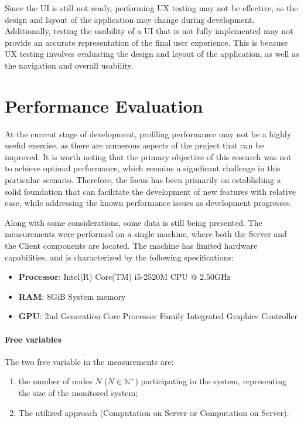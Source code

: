 Since the UI is still not ready, performing UX testing may not be effective, as the design and layout of the application may change during development. Additionally, testing the usability of a UI that is not fully implemented may not provide an accurate representation of the final user experience. This is because UX testing involves evaluating the design and layout of the application, as well as the navigation and overall usability.

\section{Performance Evaluation}
\label{sec:performance-evaluation}
At the current stage of development, profiling performance may not be a highly useful exercise, as there are numerous aspects of the project that can be improved. It is worth noting that the primary objective of this research was not to achieve optimal performance, which remains a significant challenge in this particular scenario. Therefore, the focus has been primarily on establishing a solid foundation that can facilitate the development of new features with relative ease, while addressing the known performance issues as development progresses.\newline

Along with some considerations, some data is still being presented. The measurements were performed on a single machine, where both the Server and the Client components are located. The machine has limited hardware capabilities, and is characterized by the following specifications:

\begin{itemize}
	\item \textbf{Processor}: Intel(R) Core(TM) i5-2520M CPU @ 2.50GHz
	\item \textbf{RAM}: 8GiB System memory
	\item \textbf{GPU}: 2nd Generation Core Processor Family Integrated Graphics Controller
\end{itemize}

\paragraph{Free variables}
The two free variable in the measurements are:
\begin{enumerate}
	\item the number of nodes $N$ ($N \in \mathbb{N}^{+}$) participating in the system, representing the size of the monitored system;
	\item The utilized approach (Computation on Server or Computation on Server).
\end{enumerate}
